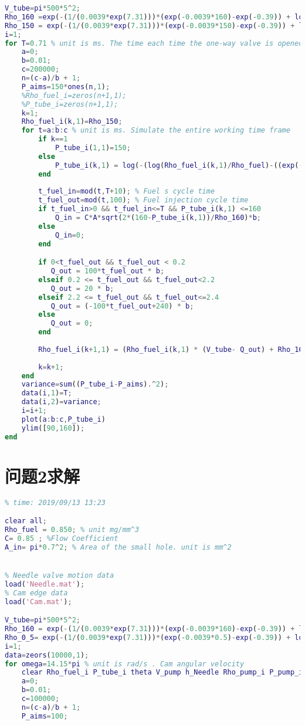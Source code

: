 \documentclass[withoutpreface,bwprint]{cumcmthesis} %
\begin{document}
\begin{appendices}
\begin{lstlisting}[language=matlab]
V_tube=pi*500*5^2;
Rho_160 =exp(-(1/(0.0039*exp(7.31)))*(exp(-0.0039*160)-exp(-0.39)) + log(0.85)); % Fuel density at a pressure of 160 MPa
Rho_150 = exp(-(1/(0.0039*exp(7.31)))*(exp(-0.0039*150)-exp(-0.39)) + log(0.85));
i=1;
for T=0.71 % unit is ms. The time each time the one-way valve is opened
    a=0;
    b=0.01;
    c=200000;
    n=(c-a)/b + 1;
    P_aims=150*ones(n,1);
    %Rho_fuel_i=zeros(n+1,1);
    %P_tube_i=zeros(n+1,1);
    k=1;
    Rho_fuel_i(k,1)=Rho_150;
    for t=a:b:c % unit is ms. Simulate the entire working time frame
        if k==1
            P_tube_i(1,1)=150;
        else
            P_tube_i(k,1) = log(-(log(Rho_fuel_i(k,1)/Rho_fuel)-((exp(-0.39))/(0.0039*exp(7.31))))*0.0039*exp(7.31))*(-1/0.0039);
        end
        
        t_fuel_in=mod(t,T+10); % Fuel s cycle time
        t_fuel_out=mod(t,100); % Fuel injection cycle time
        if t_fuel_in>0 && t_fuel_in<=T && P_tube_i(k,1) <=160
            Q_in = C*A*sqrt(2*(160-P_tube_i(k,1))/Rho_160)*b;
        else
            Q_in=0;
        end

        if 0<t_fuel_out && t_fuel_out < 0.2 
           Q_out = 100*t_fuel_out * b;
        elseif 0.2 <= t_fuel_out && t_fuel_out<2.2
           Q_out = 20 * b;
        elseif 2.2 <= t_fuel_out && t_fuel_out<=2.4
           Q_out = (-100*t_fuel_out+240) * b;
        else
           Q_out = 0;
        end
        
        Rho_fuel_i(k+1,1) = (Rho_fuel_i(k,1) * (V_tube- Q_out) + Rho_160 * Q_in) /V_tube;
        
        k=k+1;
    end
    variance=sum((P_tube_i-P_aims).^2);
    data(i,1)=T;
    data(i,2)=variance;
    i=i+1;
	plot(a:b:c,P_tube_i)
    ylim([90,160]);
end

\end{lstlisting}


\section{问题2求解} 
\begin{lstlisting}[language=matlab]
% 2019_A Q2
% time: 2019/09/13 13:23

clear all;
Rho_fuel = 0.850; % unit mg/mm^3
C= 0.85 ; %Flow Coefficient
A_in= pi*0.7^2; % Area of the small hole. unit is mm^2


% Needle valve motion data
load('Needle.mat');
% Cam edge data
load('Cam.mat');

V_tube=pi*500*5^2;
Rho_160 = exp(-(1/(0.0039*exp(7.31)))*(exp(-0.0039*160)-exp(-0.39)) + log(0.85)); % Fuel density at a pressure of 160 MPa
Rho_0_5= exp(-(1/(0.0039*exp(7.31)))*(exp(-0.0039*0.5)-exp(-0.39)) + log(0.85)); % Fuel density at a pressure of 0.5 MPa
i=1;
data=zeors(10000,1);
for omega=14.15*pi % unit is rad/s . Cam angular velocity
    clear Rho_fuel_i P_tube_i theta V_pump h_Needle Rho_pump_i P_pump_i m_Q_in A_out m_Q_out
    a=0;
    b=0.01;
    c=100000;
    n=(c-a)/b + 1;
    P_aims=100;
    

\end{lstlisting}
\end{appendices}
\end{document}
